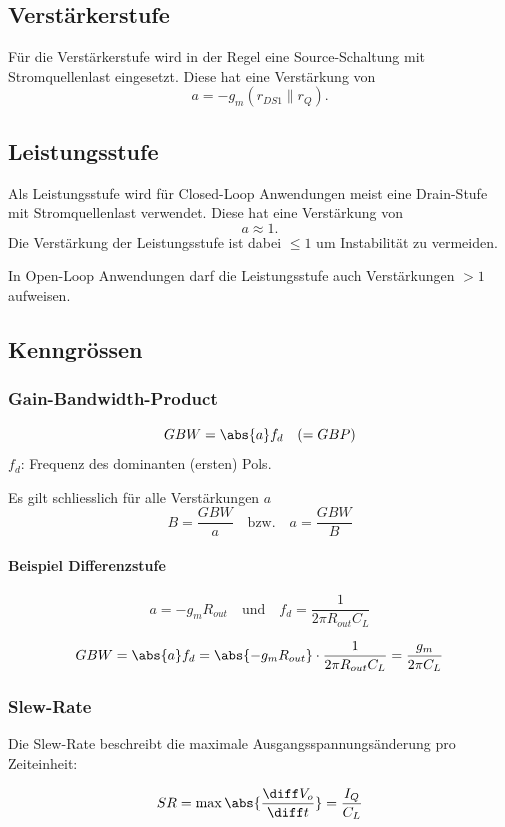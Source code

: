 \subsection{Verstärkerstufe}
Für die Verstärkerstufe wird in der Regel eine Source-Schaltung mit Stromquellenlast eingesetzt.
Diese hat eine Verstärkung von
\[
    a = -g_m (r_{DS1} \parallel r_Q).
\]

\subsection{Leistungsstufe}
Als Leistungsstufe wird für Closed-Loop Anwendungen meist eine Drain-Stufe mit Stromquellenlast verwendet.
Diese hat eine Verstärkung von
\[
    a \approx 1.
\]
Die Verstärkung der Leistungsstufe ist dabei $\leq 1$ um Instabilität zu vermeiden.


In Open-Loop Anwendungen darf die Leistungsstufe auch Verstärkungen $>1$ aufweisen.


\subsection{Kenngrössen}

\subsubsection{Gain-Bandwidth-Product}
\[
    GBW = \abs{a} f_d \quad (= GBP)
\]
$f_d$: Frequenz des dominanten (ersten) Pols.

Es gilt schliesslich für alle Verstärkungen $a$
\[
    B = \frac{GBW}{a} \quad \text{bzw.} \quad a = \frac{GBW}{B}
\]

\paragraph{Beispiel Differenzstufe}
\[
    a = -g_m R_{out} \quad \text{und} \quad f_d = \frac{1}{2 \pi R_{out} C_L}
\]
\begin{center}
    \textdownarrow
\end{center}
\[
    GBW = \abs{a} f_d = \abs{-g_m R_{out}} \cdot \frac{1}{2 \pi R_{out} C_L} = \frac{g_m}{2 \pi C_L}
\]

\subsubsection{Slew-Rate}
Die Slew-Rate beschreibt die maximale Ausgangsspannungsänderung pro Zeiteinheit:

\[
    SR = \max{\abs{\frac{\diff V_o}{\diff t}}} = \frac{I_Q}{C_L}
\]

